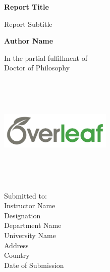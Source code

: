\begin{titlepage}
   \begin{center}
       \vspace*{1cm}

       \textbf{Report Title}

       \vspace{0.5cm}
        Report Subtitle
            
       \vspace{1.3cm}

       \textbf{Author Name}

        \vspace{0.8cm}
        
       In the partial fulfillment  of\\
       Doctor of Philosophy
       
        \vfill

     
       \includegraphics[width=0.4\textwidth,height=150pt]{images/demo.png}
       
       Submitted to:\\
       \vspace{0.15cm}
       Instructor Name\\
       Designation\\
       Department Name\\
       University Name\\
       Address\\
       Country\\
       
       \vspace{0.8cm}
       Date of Submission
            
   \end{center}
\end{titlepage}